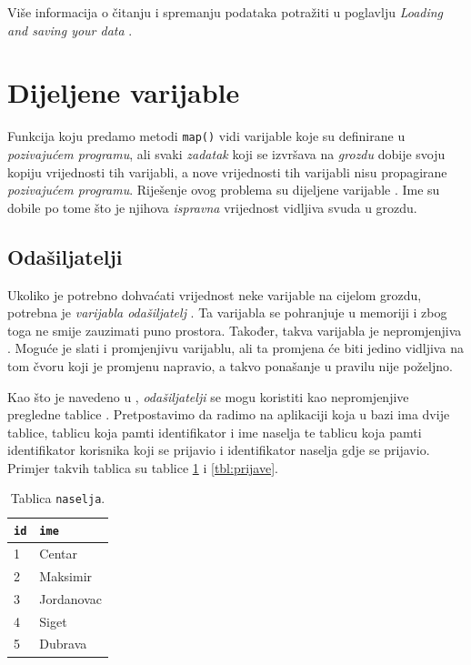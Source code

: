 \documentclass[times, utf8, zavrsni, numeric]{fer}
\begin{document}
Više informacija o čitanju i spremanju podataka potražiti u poglavlju \emph{Loading and saving your data} \cite{learningSpark}.

\section{Dijeljene varijable}
Funkcija koju predamo metodi \texttt{map()} vidi varijable koje su definirane u \emph{pozivajućem programu}, ali svaki \emph{zadatak}  koji se izvršava na \emph{grozdu} dobije svoju kopiju vrijednosti tih varijabli, a nove vrijednosti tih varijabli nisu propagirane \emph{pozivajućem programu}. Riješenje ovog problema su dijeljene varijable . Ime su dobile po tome što je njihova \emph{ispravna} vrijednost vidljiva svuda u grozdu.

\subsection{Odašiljatelji}
Ukoliko je potrebno dohvaćati vrijednost neke varijable na cijelom grozdu, potrebna je \emph{varijabla odašiljatelj} . Ta varijabla se pohranjuje u memoriji i zbog toga ne smije zauzimati puno prostora. Također, takva varijabla je nepromjenjiva . Moguće je slati i promjenjivu varijablu, ali ta promjena će biti jedino vidljiva na tom čvoru koji je promjenu napravio, a takvo ponašanje u pravilu nije poželjno. 

Kao što je navedeno u \cite{officialDocumentation}, \emph{odašiljatelji} se mogu koristiti kao nepromjenjive pregledne tablice . 
Pretpostavimo da radimo na aplikaciji koja u bazi ima dvije tablice, tablicu koja pamti identifikator i ime naselja te tablicu koja pamti identifikator korisnika koji se prijavio i identifikator naselja gdje se prijavio. Primjer takvih tablica su tablice \ref{tbl:naselja} i \ref{tbl:prijave}.

\begin{table}[htb]
\caption{Tablica \texttt{naselja}.}
\label{tbl:naselja}
\centering
\begin{tabular}{ll} 
\hline
\texttt{id} & \texttt{ime}\\
\hline
1 & Centar\\
2 & Maksimir\\
3 & Jordanovac\\
4 & Siget\\
5 & Dubrava\\
\hline
\end{tabular}
\end{table}
\end{document}
